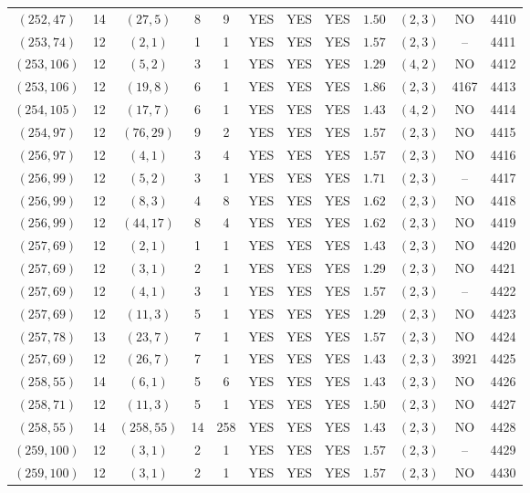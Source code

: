 \begin{longtable}{|c|c|c|c|c|c|c|c|c|c|c|c|}
$(252,47)$ & 14 & $(27,5)$ & 8 & 9 & YES & YES & YES & $1.50$ & $(2,3)$ & NO & 4410\\
$(253,74)$ & 12 & $(2,1)$ & 1 & 1 & YES & YES & YES & $1.57$ & $(2,3)$ & -- & 4411\\
$(253,106)$ & 12 & $(5,2)$ & 3 & 1 & YES & YES & YES & $1.29$ & $(4,2)$ & NO & 4412\\
$(253,106)$ & 12 & $(19,8)$ & 6 & 1 & YES & YES & YES & $1.86$ & $(2,3)$ & 4167 & 4413\\
$(254,105)$ & 12 & $(17,7)$ & 6 & 1 & YES & YES & YES & $1.43$ & $(4,2)$ & NO & 4414\\
$(254,97)$ & 12 & $(76,29)$ & 9 & 2 & YES & YES & YES & $1.57$ & $(2,3)$ & NO & 4415\\
$(256,97)$ & 12 & $(4,1)$ & 3 & 4 & YES & YES & YES & $1.57$ & $(2,3)$ & NO & 4416\\
$(256,99)$ & 12 & $(5,2)$ & 3 & 1 & YES & YES & YES & $1.71$ & $(2,3)$ & -- & 4417\\
$(256,99)$ & 12 & $(8,3)$ & 4 & 8 & YES & YES & YES & $1.62$ & $(2,3)$ & NO & 4418\\
$(256,99)$ & 12 & $(44,17)$ & 8 & 4 & YES & YES & YES & $1.62$ & $(2,3)$ & NO & 4419\\
$(257,69)$ & 12 & $(2,1)$ & 1 & 1 & YES & YES & YES & $1.43$ & $(2,3)$ & NO & 4420\\
$(257,69)$ & 12 & $(3,1)$ & 2 & 1 & YES & YES & YES & $1.29$ & $(2,3)$ & NO & 4421\\
$(257,69)$ & 12 & $(4,1)$ & 3 & 1 & YES & YES & YES & $1.57$ & $(2,3)$ & -- & 4422\\
$(257,69)$ & 12 & $(11,3)$ & 5 & 1 & YES & YES & YES & $1.29$ & $(2,3)$ & NO & 4423\\
$(257,78)$ & 13 & $(23,7)$ & 7 & 1 & YES & YES & YES & $1.57$ & $(2,3)$ & NO & 4424\\
$(257,69)$ & 12 & $(26,7)$ & 7 & 1 & YES & YES & YES & $1.43$ & $(2,3)$ & 3921 & 4425\\
$(258,55)$ & 14 & $(6,1)$ & 5 & 6 & YES & YES & YES & $1.43$ & $(2,3)$ & NO & 4426\\
$(258,71)$ & 12 & $(11,3)$ & 5 & 1 & YES & YES & YES & $1.50$ & $(2,3)$ & NO & 4427\\
$(258,55)$ & 14 & $(258,55)$ & 14 & 258 & YES & YES & YES & $1.43$ & $(2,3)$ & NO & 4428\\
$(259,100)$ & 12 & $(3,1)$ & 2 & 1 & YES & YES & YES & $1.57$ & $(2,3)$ & -- & 4429\\
$(259,100)$ & 12 & $(3,1)$ & 2 & 1 & YES & YES & YES & $1.57$ & $(2,3)$ & NO & 4430\\

\end{longtable}
